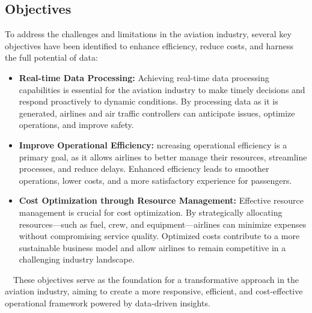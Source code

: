 \documentclass[12pt,a4paper]{article}
\begin{document}
    \subsection{Objectives}
    To address the challenges and limitations in the aviation industry, several
    key objectives have been identified to enhance efficiency, reduce costs, and
    harness the full potential of data:
    \begin{itemize}
        \item \textbf{Real-time Data Processing:} Achieving real-time data
        processing capabilities is essential for the aviation industry to make
        timely decisions and respond proactively to dynamic conditions. By
        processing data as it is generated, airlines and air traffic controllers
        can anticipate issues, optimize operations, and improve safety.
        \item \textbf{Improve Operational Efficiency:} ncreasing operational
        efficiency is a primary goal, as it allows airlines to better manage
        their resources, streamline processes, and reduce delays. Enhanced
        efficiency leads to smoother operations, lower costs, and a more
        satisfactory experience for passengers.
        \item \textbf{Cost Optimization through Resource Management:} Effective
        resource management is crucial for cost optimization. By strategically
        allocating resources—such as fuel, crew, and equipment—airlines can
        minimize expenses without compromising service quality. Optimized costs
        contribute to a more sustainable business model and allow airlines to
        remain competitive in a challenging industry landscape.

    \end{itemize}
    $\quad$These objectives serve as the foundation for a transformative
    approach in the aviation industry, aiming to create a more responsive,
    efficient, and cost-effective operational framework powered by data-driven
    insights.
\end{document}
